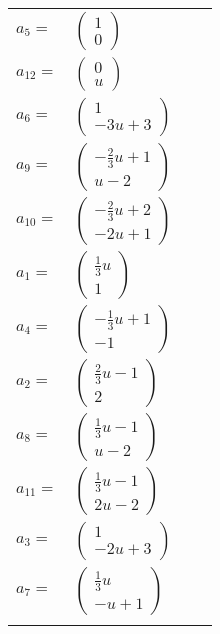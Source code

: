 \documentclass[1p]{elsarticle_modified}
\theoremstyle{definition}
\begin{document}
\begin{tabular}{m{7pt} m{180pt} m{7pt} m{180pt} }
\flushright $a_{5}=$&$\begin{pmatrix}1\\0\end{pmatrix}$ \\
\flushright $a_{12}=$&$\begin{pmatrix}0\\u\end{pmatrix}$ \\
\flushright $a_{6}=$&$\begin{pmatrix}1\\-3 u+3\end{pmatrix}$ \\
\flushright $a_{9}=$&$\begin{pmatrix}-\frac{2}{3} u+1\\u-2\end{pmatrix}$ \\
\flushright $a_{10}=$&$\begin{pmatrix}-\frac{2}{3} u+2\\-2 u+1\end{pmatrix}$ \\
\flushright $a_{1}=$&$\begin{pmatrix}\frac{1}{3} u\\1\end{pmatrix}$ \\
\flushright $a_{4}=$&$\begin{pmatrix}-\frac{1}{3} u+1\\-1\end{pmatrix}$ \\
\flushright $a_{2}=$&$\begin{pmatrix}\frac{2}{3} u-1\\2\end{pmatrix}$ \\
\flushright $a_{8}=$&$\begin{pmatrix}\frac{1}{3} u-1\\u-2\end{pmatrix}$ \\
\flushright $a_{11}=$&$\begin{pmatrix}\frac{1}{3} u-1\\2 u-2\end{pmatrix}$ \\
\flushright $a_{3}=$&$\begin{pmatrix}1\\-2 u+3\end{pmatrix}$ \\
\flushright $a_{7}=$&$\begin{pmatrix}\frac{1}{3} u\\- u+1\end{pmatrix}$\\&\end{tabular}
\end{document}
